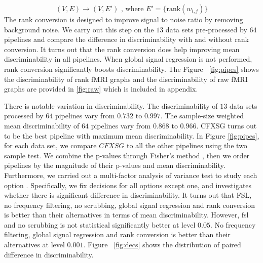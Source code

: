 \documentclass{article}
\begin{document}
\[(V,E) \rightarrow (V,E') \text{ , where } E'= \{\text{rank}(w_{i,j})\} \]
The rank conversion is designed to improve signal to noise ratio by removing background noise. We carry out this step on the $13$ data sets pre-processed by $64$ pipelines and compare the difference in discriminability with and without rank conversion. It turns out that the rank conversion does help improving mean discriminability in all pipelines. When global signal regression is not performed, rank conversion significantly boosts discriminability. The Figure ~\ref{fig:pipes} shows the discriminability of rank fMRI graphs and the discriminability of raw fMRI graphs are provided in \ref{fig:raw} which is included in appendix. 

There is notable variation in discriminability. The discriminability of $13$ data sets processed by $64$ pipelines vary from $0.732$ to $0.997$. The sample-size weighted mean discriminability of  $64$ pipelines vary from $0.868$ to $0.966$. CFXSG turns out to be the best pipeline with maximum mean discriminability. In Figure \ref{fig:pipes}, for each data set, we compare $CFXSG$ to all the other pipelines using the two sample test. We combine the p-values through Fisher's method \cite{fisher1925statistical}, then we order pipelines by the magnitude of their p-values and mean discriminability. Furthermore, we carried out a multi-factor analysis of variance test to study each option \cite{hair2009multivariate}. Specifically, we fix decisions for all options except one, and investigates whether there is significant difference in discriminability. It turns out that FSL, no frequency filtering, no scrubbing, global signal regression and rank conversion is better than their alternatives in terms of mean discriminability. However, fsl and no scrubbing is not statistical significantly better at level $0.05$. No frequency filtering, global signal regression and rank conversion is better than their alternatives at level $0.001$. Figure ~\ref{fig:decs} shows the distribution of paired difference in discriminability.
 
\end{document}
